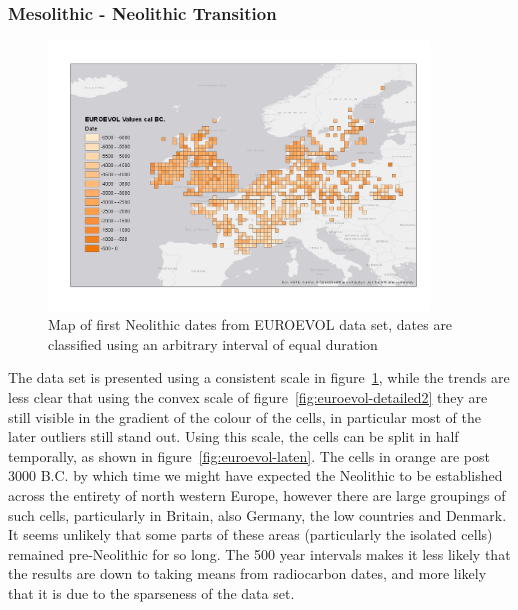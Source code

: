 \subsubsection{Mesolithic - Neolithic Transition}
\begin{figure}
\begin{center}
	\includegraphics[width=0.9\textwidth]{figures/euroevol-values}
\end{center}
  \caption{Map of first Neolithic dates from EUROEVOL data set, dates are classified using an arbitrary interval of equal duration}
  \label{fig:euroevol-all}
\end{figure}

The data set is presented using a consistent scale in figure~\ref{fig:euroevol-all}, while the trends are less clear that using the convex scale of figure~\ref{fig:euroevol-detailed2} they are still visible in the gradient of the colour of the cells, in particular most of the later outliers still stand out. Using this scale, the cells can be split in half temporally, as shown in figure~\ref{fig:euroevol-laten}. The cells in orange are post 3000 B.C. by which time we might have expected the Neolithic to be established across the entirety of north western Europe, however there are large groupings of such cells, particularly in Britain, also Germany, the low countries and Denmark. It seems unlikely that some parts of these areas (particularly the isolated cells) remained pre-Neolithic for so long. The 500 year intervals makes it less likely that the results are down to taking means from radiocarbon dates, and more likely that it is due to the sparseness of the data set.

